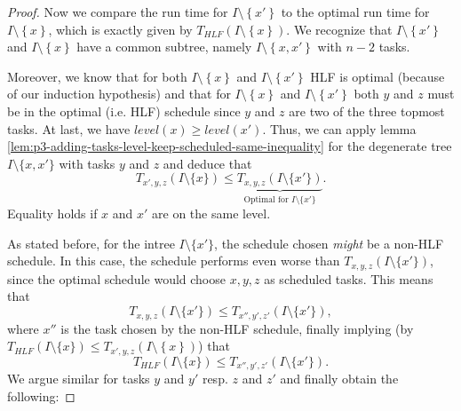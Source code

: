 \begin{proof}
  Now we compare the run time for $I\setminus\left\{ x' \right\}$ to the optimal run time for $I \setminus\left\{ x \right\}$, which is exactly given by $T_{HLF}\left( I \setminus\left\{ x \right\} \right)$. We recognize that $I\setminus\left\{ x' \right\}$ and $I\setminus\left\{ x \right\}$ have a common subtree, namely $I\setminus\left\{ x,x' \right\}$ with $n-2$ tasks.
  
  Moreover, we know that for both $I\setminus\left\{ x \right\}$ and $I\setminus\left\{ x' \right\}$ HLF is optimal (because of our induction hypothesis) and that for $I\setminus\left\{ x \right\}$ and $I\setminus\left\{ x' \right\}$ both $y$ and $z$ must be in the optimal (i.e. HLF) schedule since $y$ and $z$ are two of the three topmost tasks. At last, we have $level(x) \geq level(x')$.
  Thus, we can apply lemma \ref{lem:p3-adding-tasks-level-keep-scheduled-same-inequality} for the degenerate tree $I\setminus \{x,x'\}$ with tasks $y$ and $z$ and deduce that
  \begin{equation*}
    T_{x',y,z}(I\setminus\{x\}) 
    \leq 
    \underbrace{T_{x,y,z}(I\setminus\{x'\})}_{\text{Optimal for $I\setminus \{x'\}$}}.
  \end{equation*}
  Equality holds if $x$ and $x'$ are on the same level.

  As stated before, for the intree $I\setminus\{x'\}$, the schedule chosen \emph{might} be a non-HLF schedule. In this case, the schedule performs even worse than $T_{x,y,z}(I\setminus\{ x'  \})$, since the optimal schedule would choose $x,y,z$ as scheduled tasks. This means that
  \begin{equation*}
    T_{x,y,z}(I\setminus\{x'\})
    \leq
    T_{x'',y',z'}(I\setminus\{x'\}),
  \end{equation*}
  where $x''$ is the task chosen by the non-HLF schedule, finally implying (by $T_{HLF}(I\setminus\{x\}) \leq T_{x',y,z}\left( I\setminus\left\{ x \right\} \right)$) that
  \begin{equation*}
    T_{HLF}(I\setminus\{x\})
    \leq
    T_{x'',y',z'}(I\setminus\{x'\}).
  \end{equation*}
  We argue similar for tasks $y$ and $y'$ resp. $z$ and $z'$ and finally obtain the following:


\end{proof}
